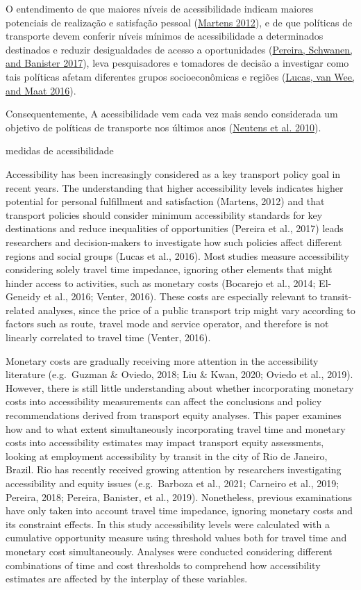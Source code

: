 \documentclass[msc,numbers]{coppe}
\begin{document}
  O entendimento de que maiores níveis de acessibilidade indicam maiores potenciais de realização e satisfação pessoal (\protect\hyperlink{ref-martens2012justice}{Martens 2012}), e de que políticas de transporte devem conferir níveis mínimos de acessibilidade a determinados destinados e reduzir desigualdades de acesso a oportunidades (\protect\hyperlink{ref-pereira2017distributive}{Pereira, Schwanen, and Banister 2017}), leva pesquisadores e tomadores de decisão a investigar como tais políticas afetam diferentes grupos socioeconômicas e regiões (\protect\hyperlink{ref-lucas2016method}{Lucas, van Wee, and Maat 2016}).

  Consequentemente, A acessibilidade vem cada vez mais sendo considerada um objetivo de políticas de transporte nos últimos anos (\protect\hyperlink{ref-neutens2010equity}{Neutens et al. 2010}).

  medidas de acessibilidade

  Accessibility has been increasingly considered as a key transport policy goal in recent years. The understanding that higher accessibility levels indicates higher potential for personal fulfillment and satisfaction (Martens, 2012) and that transport policies should consider minimum accessibility standards for key destinations and reduce inequalities of opportunities (Pereira et al., 2017) leads researchers and decision-makers to investigate how such policies affect different regions and social groups (Lucas et al., 2016). Most studies measure accessibility considering solely travel time impedance, ignoring other elements that might hinder access to activities, such as monetary costs (Bocarejo et al., 2014; El-Geneidy et al., 2016; Venter, 2016). These costs are especially relevant to transit-related analyses, since the price of a public transport trip might vary according to factors such as route, travel mode and service operator, and therefore is not linearly correlated to travel time (Venter, 2016).

  Monetary costs are gradually receiving more attention in the accessibility literature (e.g.~Guzman \& Oviedo, 2018; Liu \& Kwan, 2020; Oviedo et al., 2019). However, there is still little understanding about whether incorporating monetary costs into accessibility measurements can affect the conclusions and policy recommendations derived from transport equity analyses. This paper examines how and to what extent simultaneously incorporating travel time and monetary costs into accessibility estimates may impact transport equity assessments, looking at employment accessibility by transit in the city of Rio de Janeiro, Brazil. Rio has recently received growing attention by researchers investigating accessibility and equity issues (e.g.~Barboza et al., 2021; Carneiro et al., 2019; Pereira, 2018; Pereira, Banister, et al., 2019). Nonetheless, previous examinations have only taken into account travel time impedance, ignoring monetary costs and its constraint effects. In this study accessibility levels were calculated with a cumulative opportunity measure using threshold values both for travel time and monetary cost simultaneously. Analyses were conducted considering different combinations of time and cost thresholds to comprehend how accessibility estimates are affected by the interplay of these variables.
\end{document}
